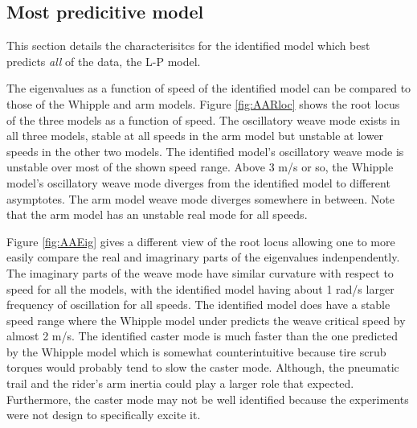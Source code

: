 \documentclass[a4paper]{article}
\begin{document}
\subsection{Most predicitive model}

This section details the characterisitcs for the identified model which best
predicts \emph{all} of the data, the L-P model.

The eigenvalues as a function of speed of the identified model can be compared
to those of the Whipple and arm models. Figure \ref{fig:AARloc} shows the root
locus of the three models as a function of speed. The oscillatory weave mode
exists in all three models, stable at all speeds in the arm model but unstable
at lower speeds in the other two models. The identified model's oscillatory
weave mode is unstable over most of the shown speed range. Above 3 m/s or so,
the Whipple model's oscillatory weave mode diverges from the identified model
to different asymptotes. The arm model weave mode diverges somewhere in
between. Note that the arm model has an unstable real mode for all speeds.

Figure \ref{fig:AAEig} gives a different view of the root locus allowing one to
more easily compare the real and imagrinary parts of the eigenvalues
indenpendently. The imaginary parts of the weave mode have similar curvature
with respect to speed for all the models, with the identified model having
about 1 rad/s larger frequency of oscillation for all speeds. The identified
model does have a stable speed range where the Whipple model under predicts the
weave critical speed by almost 2 m/s. The identified caster mode is much faster
than the one predicted by the Whipple model which is somewhat counterintuitive
because tire scrub torques would probably tend to slow the caster mode.
Although, the pneumatic trail and the rider's arm inertia could play a larger
role that expected. Furthermore, the caster mode may not be well identified
because the experiments were not design to specifically excite it.
\end{document}
